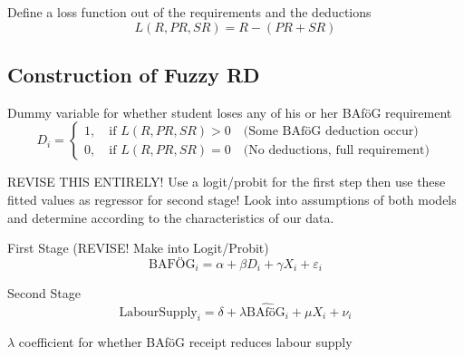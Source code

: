 Define a loss function out of the requirements and the deductions 
\begin{equation}
L(R, PR, SR) = R - (PR + SR)
\end{equation}


\subsection{Construction of Fuzzy RD}


Dummy variable for whether student loses any of his or her BAföG requirement
\begin{equation}
D_{i} = 
\begin{cases}
  1, \quad \text{if } L(R, PR, SR) > 0 \quad \text{(Some BAföG deduction occur)} \\
  0, \quad \text{if } L(R, PR, SR) = 0 \quad \text{(No deductions, full requirement)}
\end{cases}
\end{equation}

REVISE THIS ENTIRELY! Use a logit/probit for the first step then 
use these fitted values as regressor for second stage! 
Look into assumptions of both models and determine according to the 
characteristics of our data. 


First Stage (REVISE! Make into Logit/Probit)
\[ 
\text{BAFÖG}_{i} = \alpha + \beta D_{i} + \gamma X_{i} + \varepsilon_{i}
\]

Second Stage
\[ 
 \text{LabourSupply}_{i} = \delta + \lambda \widehat{\text{BAföG}}_{i} + \mu X_{i} + \nu_{i}
\]

\( \lambda \) coefficient for whether BAföG receipt reduces labour supply





